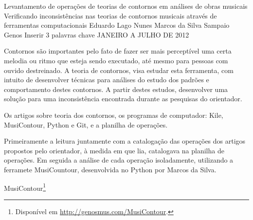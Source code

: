 \documentclass[11pt]{article}
\begin{document}
\graphicspath{{figs/}}


\dadosRelatorioFinal
{Levantamento de operações de teorias de contornos em análises de
  obras musicais}
{Verificando inconsistências nas teorias de contornos musicais através
  de ferramentas computacionais }
{Eduardo Lago Nunes}
{Marcos da Silva Sampaio}
{Genos}
{Inserir 3 palavras chave}
{JANEIRO A JULHO DE 2012}


\newpage

\setcounter{page}{1}
\onehalfspace

\label{sec:introducao}

Contornos são importantes pelo fato de fazer ser mais perceptível uma certa 
melodia ou ritmo que esteja sendo executado, até mesmo para pessoas com ouvido
destreinado.
A teoria de contornos, visa estudar esta ferramenta, com intuito de desenvolver
técnicas para análises do estudo dos padrões e comportamento destes contornos.
A partir destes estudos, desenvolver uma solução para uma inconsistência encontrada
durante as pesquisas do orientador.


\label{sec:materiais}

Os artigos sobre teoria dos contornos, os programas de computador: Kile, MusiContour,
Python e Git, e a planilha de operações.%

Primeiramente a leitura juntamente com a catalogação das operações dos artigos 
propostos pelo orientador, à medida em que lia, catalogava na planilha de operações.
Em seguida a análise de cada operação isoladamente, utilizando a ferramete MusiCountour,
desenvolvida no Python por Marcos da Silva.%

MusiContour\footnote{Disponível em \url{http://genosmus.com/MusiContour}.}
\end{document}
